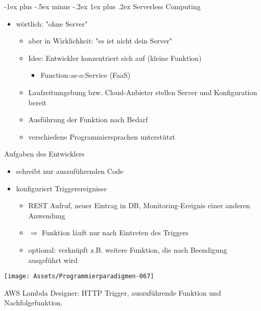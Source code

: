\documentclass[10pt]{article}
\makeatletter
\renewcommand{\subsubsection}{\@startsection{subsubsection}{3}{0mm}%
                                {-1ex plus -.5ex minus -.2ex}%
                                {1ex plus .2ex}%
                                {\normalfont\small\bfseries}}
\makeatother
\begin{document}
\subsubsection{Serverless Computing}
\begin{itemize}
  \item wörtlich: "ohne Server"
        \begin{itemize}
          \item aber in Wirklichkeit: "es ist nicht dein Server"
          \item Idee: Entwickler konzentriert sich auf (kleine Funktion)
                \begin{itemize}
                  \item Function-as-a-Service (FaaS)
                \end{itemize}
          \item Laufzeitumgebung bzw. Cloud-Anbieter stellen Server und Konfiguration bereit
          \item Ausführung der Funktion nach Bedarf
          \item verschiedene Programmiersprachen unterstützt
        \end{itemize}
\end{itemize}
Aufgaben des Entwicklers
\begin{itemize}
  \item schreibt nur auszuführenden Code
  \item konfiguriert Triggerereignisse
        \begin{itemize}
          \item REST Aufruf, neuer Eintrag in DB, Monitoring-Ereignis einer anderen Anwendung
          \item $\Rightarrow$ Funktion läuft nur nach Eintreten des Triggers
          \item optional: verknüpft z.B. weitere Funktion, die nach Beendigung ausgeführt wird
        \end{itemize}
\end{itemize}
\begin{center}
  \centering
  \texttt{[image: Assets/Programmierparadigmen-067]}
\end{center}
AWS Lambda Designer: HTTP Trigger, auszuführende Funktion und Nachfolgefunktion.
\end{document}
